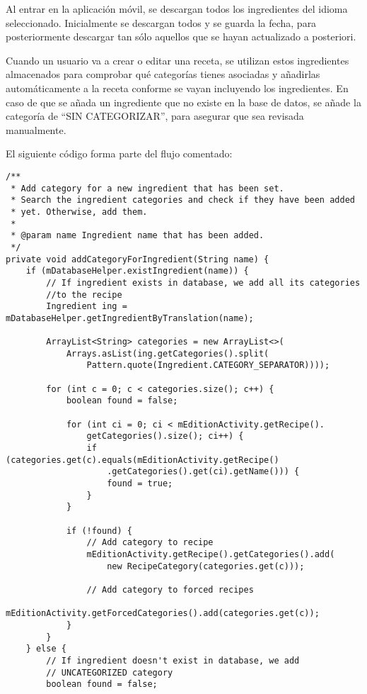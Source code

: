 Al entrar en la aplicación móvil, se descargan todos los ingredientes del
idioma seleccionado. Inicialmente se descargan todos y se guarda la fecha, para
posteriormente descargar tan sólo aquellos que se hayan actualizado a posteriori.

Cuando un usuario va a crear o editar una receta, se utilizan estos ingredientes
almacenados para comprobar qué categorías tienes asociadas y añadirlas
automáticamente a la receta conforme se vayan incluyendo los ingredientes. En
caso de que se añada un ingrediente que no existe en la base de datos, se añade
la categoría de ``SIN CATEGORIZAR'', para asegurar que sea revisada manualmente.

El siguiente código forma parte del flujo comentado:

\begin{verbatim}
/**
 * Add category for a new ingredient that has been set.
 * Search the ingredient categories and check if they have been added
 * yet. Otherwise, add them.
 *
 * @param name Ingredient name that has been added.
 */
private void addCategoryForIngredient(String name) {
    if (mDatabaseHelper.existIngredient(name)) {
        // If ingredient exists in database, we add all its categories
        //to the recipe
        Ingredient ing = mDatabaseHelper.getIngredientByTranslation(name);

        ArrayList<String> categories = new ArrayList<>(
            Arrays.asList(ing.getCategories().split(
                Pattern.quote(Ingredient.CATEGORY_SEPARATOR))));

        for (int c = 0; c < categories.size(); c++) {
            boolean found = false;

            for (int ci = 0; ci < mEditionActivity.getRecipe().
                getCategories().size(); ci++) {
                if (categories.get(c).equals(mEditionActivity.getRecipe()
                    .getCategories().get(ci).getName())) {
                    found = true;
                }
            }

            if (!found) {
                // Add category to recipe
                mEditionActivity.getRecipe().getCategories().add(
                    new RecipeCategory(categories.get(c)));

                // Add category to forced recipes
                mEditionActivity.getForcedCategories().add(categories.get(c));
            }
        }
    } else {
        // If ingredient doesn't exist in database, we add
        // UNCATEGORIZED category
        boolean found = false;


\end{verbatim}

